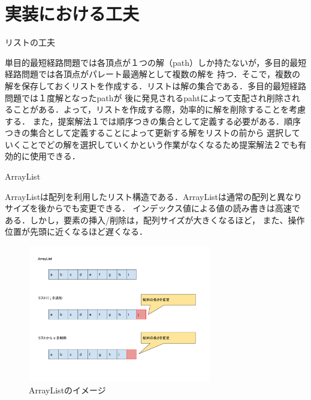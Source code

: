 \documentclass[12pt]{optlab-bachelor}
\begin{document}
\section{実装における工夫}

\begin{description}
  \item[リストの工夫]
\end{description}

単目的最短経路問題では各頂点が１つの解（path）しか持たないが，多目的最短経路問題では各頂点がパレート最適解として複数の解を
持つ．そこで，複数の解を保存しておくリストを作成する．リストは解の集合である．多目的最短経路問題では１度解となったpathが
後に発見されるpahtによって支配され削除されることがある．よって，リストを作成する際，効率的に解を削除することを考慮する．
また，提案解法１では順序つきの集合として定義する必要がある．順序つきの集合として定義することによって更新する解をリストの前から
選択していくことでどの解を選択していくかという作業がなくなるため提案解法２でも有効的に使用できる．

\begin{description}
  \item[ArrayList]
\end{description}

ArrayListは配列を利用したリスト構造である．ArrayListは通常の配列と異なりサイズを後からでも変更できる．
インデックス値による値の読み書きは高速である．しかし，要素の挿入/削除は，配列サイズが大きくなるほど，
また、操作位置が先頭に近くなるほど遅くなる．

\begin{figure}[htbp]
  \centering
  \caption{ArrayListのイメージ}
  \includegraphics[height=6.0cm, width=8.0cm]{fig/fig9.pdf}
\end{figure}
\end{document}
